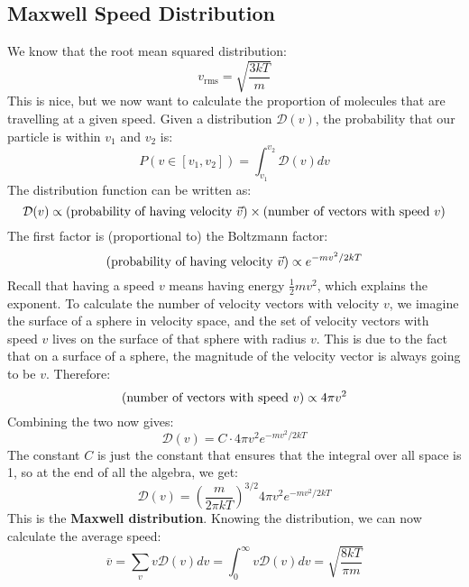 \documentclass[10pt]{article}
\begin{document}
	\subsection{Maxwell Speed Distribution}
	We know that the root mean squared distribution:
	\[
	v_{\text{rms}} = \sqrt{\frac{3kT}{m}} 
	\] 
	This is nice, but we now want to calculate the proportion of molecules that are travelling at a given speed. Given 
	a distribution \( \mathcal D(v) \), the probability that our particle is within \( v_1 \) and \( v_2 \) is:
	\[
		P(v \in [v_1, v_2]) = \int_{v_1}^{v_2} \mathcal D(v) dv
	\] 
	The distribution function can be written as:
	\[
	\mathcal D(v) \propto (\text{probability of having velocity \( \vec v \)}) \times (\text{number of vectors with speed 
	\( v \)})
	\] 
	The first factor is (proportional to) the Boltzmann factor:
	\[
		(\text{probability of having velocity \( \vec v \)}) \propto e^{-mv^2 /2kT}
	\] 
	Recall that having a speed \( v \) means having energy \( \frac{1}{2}mv^2 \), which explains the exponent. To calculate the 
	number of velocity vectors with velocity \( v \), we imagine the surface of a sphere in velocity space, and the set of 
	velocity vectors with speed \( v \) lives on the surface of that sphere with radius \( v \). This is due to the 
	fact that on a surface of a sphere, the magnitude of the velocity vector is always going to be \( v \). Therefore:
	\[
		(\text{number of vectors with speed \( v \)}) \propto 4 \pi v^2
	\] 
	Combining the two now gives:
	\[
	\mathcal D(v) = C \cdot 4 \pi v^2 e^{-mv^2 / 2kT}
	\] 
	The constant \( C \) is just the constant that ensures that the integral over all space is 1, so at the end of all the algebra, 
	we get:
	\[
	\mathcal D(v) = \left( \frac{m}{2\pi kT} \right) ^{3 /2} 4 \pi v^2 e^{-mv^2 / 2kT}
	\] 
	This is the \textbf{Maxwell distribution}. Knowing the distribution, we can now calculate the average speed:
	\[
		\overline v = \sum_{v} v \mathcal D(v) dv = \int_{0}^{\infty} v \mathcal D(v) dv = \sqrt{\frac{8kT}{\pi m}} 
	\] 
\end{document}
